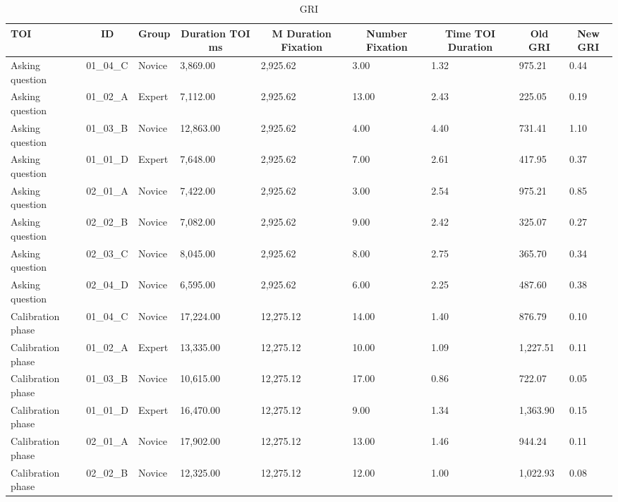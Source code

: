 \documentclass[
  english,
  man,floatsintext]{apa6}
\begin{document}
\begin{table}[h]

\begin{center}
\begin{threeparttable}

\caption{\label{tab:GRItable1}GRI}

\tiny{

\begin{tabular}{lllllllll}
\toprule
TOI & \multicolumn{1}{c}{ID} & \multicolumn{1}{c}{Group} & \multicolumn{1}{c}{Duration TOI ms} & \multicolumn{1}{c}{M Duration Fixation} & \multicolumn{1}{c}{Number Fixation} & \multicolumn{1}{c}{Time TOI Duration} & \multicolumn{1}{c}{Old GRI} & \multicolumn{1}{c}{New GRI}\\
\midrule
Asking question & 01\_04\_C & Novice & 3,869.00 & 2,925.62 & 3.00 & 1.32 & 975.21 & 0.44\\
Asking question & 01\_02\_A & Expert & 7,112.00 & 2,925.62 & 13.00 & 2.43 & 225.05 & 0.19\\
Asking question & 01\_03\_B & Novice & 12,863.00 & 2,925.62 & 4.00 & 4.40 & 731.41 & 1.10\\
Asking question & 01\_01\_D & Expert & 7,648.00 & 2,925.62 & 7.00 & 2.61 & 417.95 & 0.37\\
Asking question & 02\_01\_A & Novice & 7,422.00 & 2,925.62 & 3.00 & 2.54 & 975.21 & 0.85\\
Asking question & 02\_02\_B & Novice & 7,082.00 & 2,925.62 & 9.00 & 2.42 & 325.07 & 0.27\\
Asking question & 02\_03\_C & Novice & 8,045.00 & 2,925.62 & 8.00 & 2.75 & 365.70 & 0.34\\
Asking question & 02\_04\_D & Novice & 6,595.00 & 2,925.62 & 6.00 & 2.25 & 487.60 & 0.38\\
Calibration phase & 01\_04\_C & Novice & 17,224.00 & 12,275.12 & 14.00 & 1.40 & 876.79 & 0.10\\
Calibration phase & 01\_02\_A & Expert & 13,335.00 & 12,275.12 & 10.00 & 1.09 & 1,227.51 & 0.11\\
Calibration phase & 01\_03\_B & Novice & 10,615.00 & 12,275.12 & 17.00 & 0.86 & 722.07 & 0.05\\
Calibration phase & 01\_01\_D & Expert & 16,470.00 & 12,275.12 & 9.00 & 1.34 & 1,363.90 & 0.15\\
Calibration phase & 02\_01\_A & Novice & 17,902.00 & 12,275.12 & 13.00 & 1.46 & 944.24 & 0.11\\
Calibration phase & 02\_02\_B & Novice & 12,325.00 & 12,275.12 & 12.00 & 1.00 & 1,022.93 & 0.08\\

\end{tabular}}
\end{threeparttable}
\end{center}
\end{table}
\end{document}
